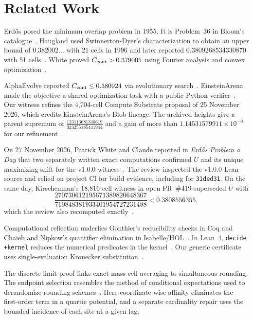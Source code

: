 \section{Related Work}
\label{sec:related}

Erd{\H{o}}s posed the minimum overlap problem in 1955. It is Problem~36
in Bloom's catalogue~\cite{Erdos1955,BloomErdos36}. Haugland used
Swinnerton-Dyer's characterization to obtain an upper bound of
$0.382002\ldots$ with 21 cells in 1996 and later reported
$0.3809268534330870$ with 51 cells~\cite{Haugland1996,Haugland2016}.
White proved $C_{\mathrm{cont}}>0.379005$ using Fourier analysis and convex
optimization~\cite{White2023}.

AlphaEvolve reported $C_{\mathrm{cont}}\le0.380924$ via evolutionary
search~\cite[Appendix~B.5]{Novikov2025AlphaEvolve}.
EinsteinArena made the objective a shared optimization task with a public
Python verifier~\cite[\S2.3 and Appendix~A.2]{Bianchi2026EinsteinArena}.
Our witness refines the 4,704-cell Compute Substrate proposal of
25 November 2026, which credits EinsteinArena's Blob lineage.
The archived heights give a parent supremum of
$\tfrac{123113681346619}{323255185441944}$ and a gain of more than
$1.14531579911\times10^{-9}$ for our refinement~\cite{ComputeSubstrate2026Parent,ComputeSubstrate2026ParentData}.

On 27 November 2026, Patrick White and Claude reported in
\emph{Erd{\H{o}}s Problem a Day} that two separately written exact
computations confirmed $U$ and its unique maximizing shift for the
v1.0.0 witness~\cite{ErdosProblemADay2026Review}. The review inspected
the v1.0.0 Lean source and relied on project CI for build evidence,
including for \texttt{31ded31}. On the same day, Kirschenman's 18,816-cell
witness in open PR~\#419 superseded $U$ with
\[
  \frac{270730612195671389820648367}{710848381933401954727231488}
  < 0.3808556355,
\]
which the review also recomputed exactly~\cite{Kirschenman2026PR419,ErdosProblemADay2026Review}.

Computational reflection underlies Gonthier's reducibility checks in Coq
and Chaieb and Nipkow's quantifier elimination in
Isabelle/HOL~\cite{Gonthier2008,ChaiebNipkow2008}. In Lean~4,
\texttt{decide +kernel} reduces the numerical predicates in the
kernel~\cite{deMouraUllrich2021,Lean436Decide}. Our generic certificate
uses single-evaluation Kronecker substitution~\cite[\S1]{Harvey2009}.

The discrete limit proof links exact-mass cell averaging to
simultaneous rounding. The endpoint selection resembles the
method of conditional expectations used to derandomize rounding
schemes~\cite{Raghavan1988}. Here coordinate-wise affinity
eliminates the first-order term in a quartic potential, and a
separate cardinality repair uses the bounded incidence of each
site at a given lag.


